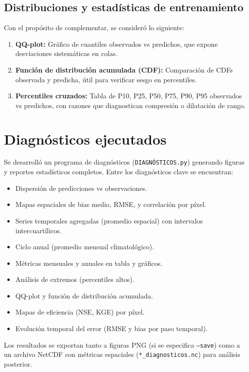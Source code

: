 \subsection{Distribuciones y estadísticas de entrenamiento}

Con el propósito de complementar, se consideró lo siguiente:
\begin{enumerate}
    \item \textbf{QQ-plot:} Gráfico de cuantiles observados vs predichos, que expone desviaciones sistemáticas en colas.
    \item \textbf{Función de distribución acumulada (CDF):} Comparación de CDFs observada y predicha, útil para verificar sesgo en percentiles.
    \item \textbf{Percentiles cruzados:} Tabla de P10, P25, P50, P75, P90, P95 observados vs predichos, con razones que diagnostican compresión o dilatación de rango.
\end{enumerate}

\section{Diagnósticos ejecutados}
\label{sec:diagnosticos}

Se desarrolló un programa de diagnósticos (\texttt{DIAGNÓSTICOS.py}) generando figuras y reportes estadísticos completos. Entre los diagnósticos clave se encuentran:

\begin{itemize}
    \item Dispersión de predicciones vs observaciones.
    \item Mapas espaciales de bias medio, RMSE, y correlación por píxel.
    \item Series temporales agregadas (promedio espacial) con intervalos intercuartílicos.
    \item Ciclo anual (promedio mensual climatológico).
    \item Métricas mensuales y anuales en tabla y gráficos.
    \item Análisis de extremos (percentiles altos).
    \item QQ-plot y función de distribución acumulada.
    \item Mapas de eficiencia (NSE, KGE) por píxel.
    \item Evolución temporal del error (RMSE y bias por paso temporal).
\end{itemize}

Los resultados se exportan tanto a figuras PNG (si se especifica \texttt{--save}) como a un archivo NetCDF con métricas espaciales (\texttt{*\_diagnosticos.nc}) para análisis posterior.

